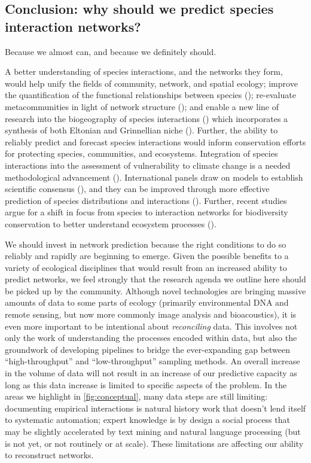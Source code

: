 \begin{refsection}
\section{Conclusion: why should we predict species interaction
networks?}\label{conclusion-why-should-we-predict-species-interaction-networks}

Because we almost can, and because we definitely should.

A better understanding of species interactions, and the networks they
form, would help unify the fields of community, network, and spatial
ecology; improve the quantification of the functional relationships
between species (\cite{Dehling2018BriElt, OConnor2020Unveiling});
re-evaluate metacommunities in light of network structure
(\cite{Guzman2019MulExt}); and enable a new line of research into the
biogeography of species interactions (\cite{Massol2017ChaFou,
Braga2019Spatial}) which incorporates a synthesis of both Eltonian and
Grinnellian niche (\cite{Gravel2019Bringing}). Further, the ability to
reliably predict and forecast species interactions would inform
conservation efforts for protecting species, communities, and
ecosystems. Integration of species interactions into the assessment of
vulnerability to climate change is a needed methodological advancement
(\cite{Foden2016IucSsc}). International panels draw on models to establish
scientific consensus (\cite{Araujo2019StaDis}), and they can be improved
through more effective prediction of species distributions and
interactions (\cite{Syfert2014UsiSpe}). Further, recent studies argue for
a shift in focus from species to interaction networks for biodiversity
conservation to better understand ecosystem processes
(\cite{Harvey2017BriEco}).

We should invest in network prediction because the right conditions to
do so reliably and rapidly are beginning to emerge. Given the possible
benefits to a variety of ecological disciplines that would result from
an increased ability to predict networks, we feel strongly that the
research agenda we outline here should be picked up by the community.
Although novel technologies are bringing massive amounts of data to some
parts of ecology (primarily environmental DNA and remote sensing, but
now more commonly image analysis and bioacoustics), it is even more
important to be intentional about \emph{reconciling} data. This involves
not only the work of understanding the processes encoded within data,
but also the groundwork of developing pipelines to bridge the
ever-expanding gap between ``high-throughput'' and ``low-throughput''
sampling methods. An overall increase in the volume of data will not
result in an increase of our predictive capacity as long as this data
increase is limited to specific aspects of the problem. In the areas we
highlight in \autoref{fig:conceptual}, many data steps are still limiting:
documenting empirical interactions is natural history work that doesn't
lend itself to systematic automation; expert knowledge is by design a
social process that may be slightly accelerated by text mining and
natural language processing (but is not yet, or not routinely or at
scale). These limitations are affecting our ability to reconstruct
networks.


\end{refsection}
